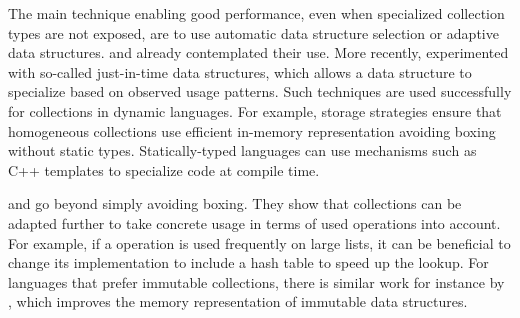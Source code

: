 \documentclass[sigconf, 10pt]{acmart}
\begin{document}
The main technique enabling good performance,
even when specialized collection types are not exposed,
are to use automatic data structure selection or adaptive data structures.
\citet[sec. 2.3]{PeytonJones:1996:BTC} and \citet{Chuang:1996:PAP}
already contemplated their use.
More recently, \citet{DeWael:15:JitData} experimented
with so-called just-in-time data structures,
which allows a data structure to specialize
based on observed usage patterns.
Such techniques are used successfully
for collections in dynamic languages.
For example, storage strategies\citep{Bolz:2013:SSC,Clifford:2015:MMD} 
ensure that homogeneous collections use efficient in-memory representation
avoiding boxing without static types. 
Statically-typed languages can use mechanisms such as
C++ templates to specialize code at compile time.

\citet{Xu2013} and \citet{Costa:2018:CS} go beyond simply avoiding boxing.
They show that collections can be adapted further to take concrete usage
in terms of used operations into account.
For example, if a  operation is used frequently
on large lists, it can be beneficial to change its implementation to include
a hash table to speed up the lookup.
For languages that prefer immutable collections,
there is similar work for instance by \citet{Pape:2017:VC},
which improves the memory representation of immutable data structures.
\end{document}
